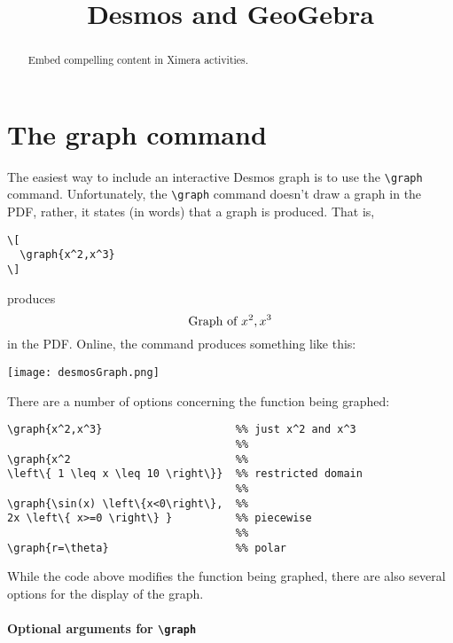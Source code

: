 \documentclass{ximera}
\title{Desmos and GeoGebra}
\begin{document}
\begin{abstract}
  Embed compelling content in Ximera activities.
\end{abstract}
\maketitle

\section{The graph command}

The easiest way to include an interactive Desmos graph is to use the
\verb|\graph| command. Unfortunately, the \verb|\graph| command
doesn't draw a graph in the PDF, rather, it states (in words) that a
graph is produced. That is,
\begin{verbatim}
\[
  \graph{x^2,x^3}
\]
\end{verbatim}
produces
\[
  \text{Graph of $x^2,x^3$}
\]
in the PDF. Online, the command produces something like this:
\begin{image}
  \texttt{[image: desmosGraph.png]}
\end{image}
There are a number of options concerning the function being graphed:
\begin{verbatim}
\graph{x^2,x^3}                     %% just x^2 and x^3
                                    %%
\graph{x^2                          %%
\left\{ 1 \leq x \leq 10 \right\}}  %% restricted domain
                                    %%
\graph{\sin(x) \left\{x<0\right\},  %%
2x \left\{ x>=0 \right\} }          %% piecewise
                                    %%
\graph{r=\theta}                    %% polar 
\end{verbatim}
While the code above modifies the function being graphed, there are also several options for the display of the graph.

\paragraph{Optional arguments for \texttt{\textbackslash graph}}
\end{document}
